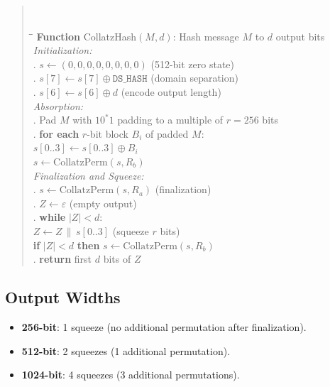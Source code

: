 \documentclass[11pt,a4paper]{article}
\begin{document}
\begin{quote}\tt
\begin{tabbing}
\hspace{2em}\=\hspace{2em}\=\kill
\textrm{\textbf{Function}} CollatzHash$(M, d)$:
\textrm{\small Hash message $M$ to $d$ output bits}\\[4pt]
\textrm{\textit{Initialization:}}\\
. $s \leftarrow (0, 0, 0, 0, 0, 0, 0, 0)$ \textrm{\small (512-bit zero state)}\\
. $s[7] \leftarrow s[7] \oplus \mathtt{DS\_HASH}$ \textrm{\small (domain separation)}\\
. $s[6] \leftarrow s[6] \oplus d$ \textrm{\small (encode output length)}\\[4pt]
\textrm{\textit{Absorption:}}\\
. Pad $M$ with $10^*1$ padding to a multiple of $r = 256$ bits\\
. \textbf{for each} $r$-bit block $B_i$ of padded $M$:\\
\> \> $s[0..3] \leftarrow s[0..3] \oplus B_i$\\
\> \> $s \leftarrow \mathrm{CollatzPerm}(s, R_b)$\\[4pt]
\textrm{\textit{Finalization and Squeeze:}}\\
. $s \leftarrow \mathrm{CollatzPerm}(s, R_a)$ \textrm{\small (finalization)}\\
. $Z \leftarrow \varepsilon$ \textrm{\small (empty output)}\\
. \textbf{while} $|Z| < d$:\\
\> \> $Z \leftarrow Z \,\|\, s[0..3]$ \textrm{\small (squeeze $r$ bits)}\\
\> \> \textbf{if} $|Z| < d$ \textbf{then}
$s \leftarrow \mathrm{CollatzPerm}(s, R_b)$\\
. \textbf{return} first $d$ bits of $Z$
\end{tabbing}
\end{quote}

\subsection{Output Widths}

\begin{itemize}
    \item \textbf{256-bit}: 1 squeeze (no additional permutation after
          finalization).
    \item \textbf{512-bit}: 2 squeezes (1 additional permutation).
    \item \textbf{1024-bit}: 4 squeezes (3 additional permutations).
\end{itemize}
\end{document}
